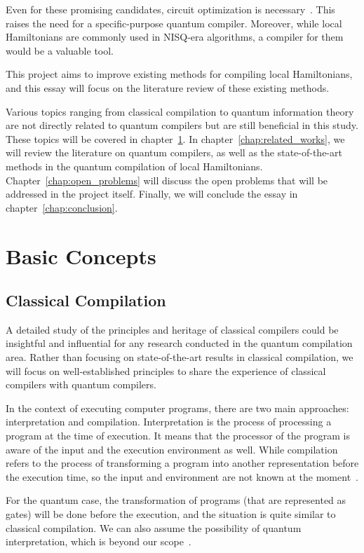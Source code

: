 \documentclass{report}
\begin{document}
Even for these promising candidates, circuit optimization is necessary~\cite{childs2018,farhi2016}. This raises the need for a specific-purpose quantum compiler. Moreover, while local Hamiltonians are commonly used in NISQ-era algorithms\cite{daley2022}, a compiler for them would be a valuable tool.

This project aims to improve existing methods for compiling local Hamiltonians, and this essay will focus on the literature review of these existing methods.

Various topics ranging from classical compilation to quantum information theory are not directly related to quantum compilers but are still beneficial in this study. These topics will be covered in chapter~\ref{chap:basic_concepts}. In chapter~\ref{chap:related_works}, we will review the literature on quantum compilers, as well as the state-of-the-art methods in the quantum compilation of local Hamiltonians. Chapter~\ref{chap:open_problems} will discuss the open problems that will be addressed in the project itself. Finally, we will conclude the essay in chapter~\ref{chap:conclusion}.
\chapter{Basic Concepts}\label{chap:basic_concepts}

\section{Classical Compilation}
A detailed study of the principles and heritage of classical compilers could be insightful and influential for any research conducted in the quantum compilation area. Rather than focusing on state-of-the-art results in classical compilation, we will focus on well-established principles to share the experience of classical compilers with quantum compilers.

In the context of executing computer programs, there are two main approaches: interpretation and compilation. Interpretation is the process of processing a program at the time of execution. It means that the processor of the program is aware of the input and the execution environment as well. While compilation refers to the process of transforming a program into another representation before the execution time, so the input and environment are not known at the moment~\cite[p. 2]{aho1986}.

For the quantum case, the transformation of programs (that are represented as gates) will be done before the execution, and the situation is quite similar to classical compilation. We can also assume the possibility of quantum interpretation, which is beyond our scope~\cite{gay2009}.
\end{document}
